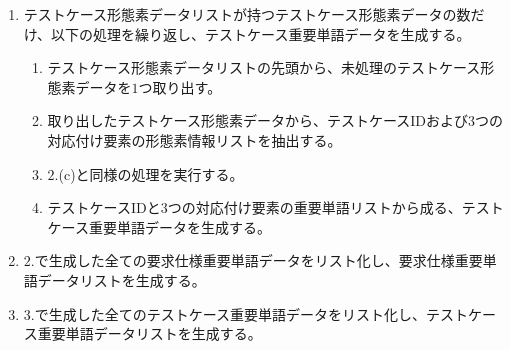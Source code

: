 \begin{enumerate}
\begin{enumerate}
\begin{enumerate}
\begin{itemize}
            \end{itemize} 
            \item 複合名詞の妥当性判定\label{enum:妥当性判定}\\
            複合名詞候補リスト内の各単語に対して、以下の2つの条件を全て満たす場合、複合名詞と判定し、$2$.(c)i.で用意した複合名詞リストに追加する。
            図\ref{fig:important_words}の②に示す例では、「文字列」を複合名詞リストに追加する。
            \begin{itemize}
                \item 文字数が$20$文字以下である\\
                $20$文字を超える複合名詞は、異常に長い文字列として除外する。
                \item 同一文字のみから成る3文字以上の単語ではない\\
                例えば、「年年年」のように、同一文字のみから成る3文字以上の単語は、意味のある複合名詞ではないと判定し、除外する。
            \end{itemize}

            \item 重要単語リストの結合\\
            名詞リスト、動詞リスト、複合名詞リストを結合し、対応付け要素の重要単語リストとして保持する。
            図\ref{fig:important_words}の③に、生成した重要単語リストの例を示す。
        \end{enumerate}
        \item 要求仕様IDと$3$つの対応付け要素の重要単語リストから成る、要求仕様重要単語データを生成する。
    \end{enumerate}

    \item テストケース形態素データリストが持つテストケース形態素データの数だけ、以下の処理を繰り返し、テストケース重要単語データを生成する。
    \begin{enumerate}
        \item テストケース形態素データリストの先頭から、未処理のテストケース形態素データを$1$つ取り出す。
        \item 取り出したテストケース形態素データから、テストケースIDおよび$3$つの対応付け要素の形態素情報リストを抽出する。
        \item $2$.(c)と同様の処理を実行する。
        \item テストケースIDと$3$つの対応付け要素の重要単語リストから成る、テストケース重要単語データを生成する。
    \end{enumerate}
    \item $2$.で生成した全ての要求仕様重要単語データをリスト化し、要求仕様重要単語データリストを生成する。                                                                                                       
    \item $3$.で生成した全てのテストケース重要単語データをリスト化し、テストケース重要単語データリストを生成する。
\end{enumerate}

